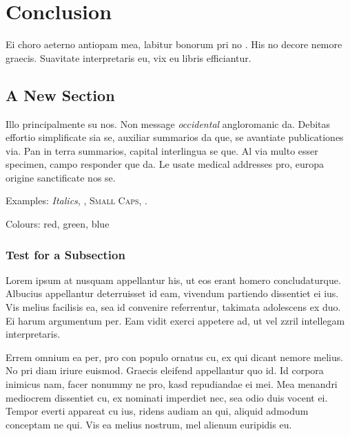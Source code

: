 \chapter{Conclusion}\label{ch:conclusion}
Ei choro aeterno antiopam mea, labitur bonorum pri no \cite{gauss}. His no decore nemore graecis. Suavitate interpretaris eu, vix eu libris efficiantur.

\section{A New Section}
Illo principalmente su nos. Non message \emph{occidental} angloromanic da. Debitas effortio simplificate sia se, auxiliar summarios da que, se avantiate publicationes via. Pan in terra summarios, capital interlingua se que. Al via multo esser specimen, campo responder que da. Le usate medical addresses pro, europa origine sanctificate nos se.

Examples: \textit{Italics}, , \textsc{Small Caps}, .

Colours: \textcolor{CTtitle}{red}, \textcolor{CTcitation}{green}, \textcolor{CTlink}{blue}


\subsection{Test for a Subsection}
Lorem ipsum at nusquam appellantur his, ut eos erant homero concludaturque. Albucius appellantur deterruisset id eam, vivendum partiendo dissentiet ei ius. Vis melius facilisis ea, sea id convenire referrentur, takimata adolescens ex duo. Ei harum argumentum per. Eam vidit exerci appetere ad, ut vel zzril intellegam interpretaris.

Errem omnium ea per, pro con populo ornatus cu, ex qui dicant nemore melius. No pri diam iriure euismod. Graecis eleifend appellantur quo id. Id corpora inimicus nam, facer nonummy ne pro, kasd repudiandae ei mei. Mea menandri mediocrem dissentiet cu, ex nominati imperdiet nec, sea odio duis vocent ei. Tempor everti appareat cu ius, ridens audiam an qui, aliquid admodum conceptam ne qui. Vis ea melius nostrum, mel alienum euripidis eu.

